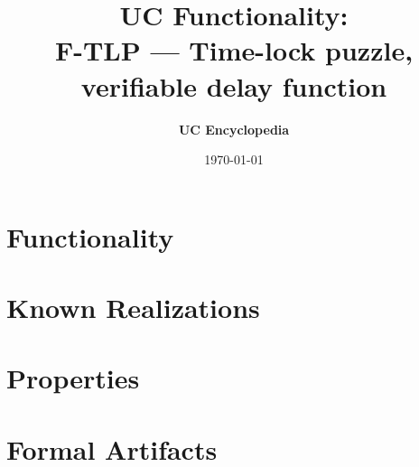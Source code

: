\documentclass[11pt,a4paper]{article}
\title{\textbf{\Large UC Functionality:}\\[0.2em] \Large F-TLP --- Time-lock puzzle, verifiable delay function}
\author{\textbf{UC Encyclopedia}}
\date{\today}
\newtheorem{functionality}{Functionality}
\begin{document}
\maketitle

\begin{abstract}
\end{abstract}

\section{Functionality}

%

\section{Known Realizations}


\section{Properties}


\section{Formal Artifacts}

\end{document}

